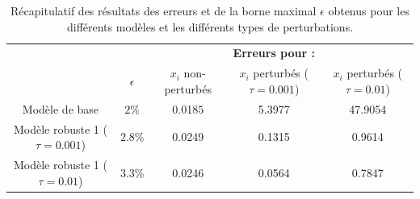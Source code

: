 \begin{table}
\centering
\begin{tabular}{c|c|ccc}
 & & & \textbf{Erreurs pour : } &\\
 & $\epsilon$ & $x_i$ non-perturbés & $x_i$ perturbés ($\tau=0.001$) & $x_i$ perturbés ($\tau=0.01$) \\
 \hline
Modèle de base & $2\%$ & 0.0185 & 5.3977 & 47.9054 \\
Modèle robuste 1 ($\tau=0.001$) & $2.8 \%$ & 0.0249 & 0.1315   & 0.9614 \\
Modèle robuste 1 ($\tau=0.01$)  & $3.3 \%$ & 0.0246 & 0.0564 & 0.7847 \\
\end{tabular}
\caption{Récapitulatif des résultats des erreurs et de la borne maximal $\epsilon$ obtenus pour les différents modèles et les différents types de perturbations.}
\label{table:Recap}
\end{table}